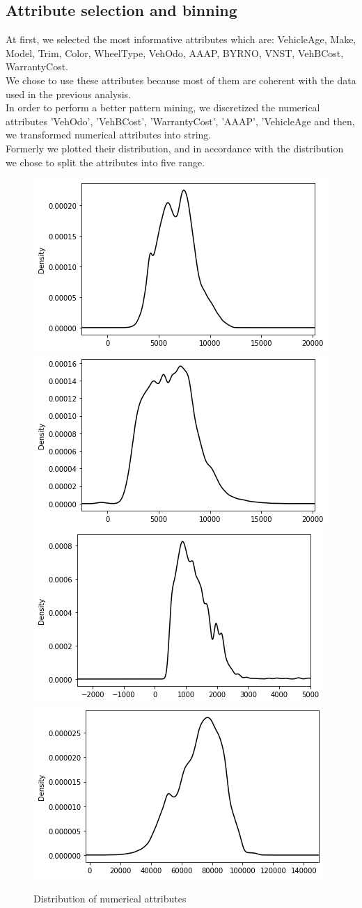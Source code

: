 \documentclass{article}
\begin{document}
	\subsection{Attribute selection and binning}
	
	At first, we selected the most informative attributes which are: VehicleAge, Make, Model, Trim, Color, WheelType, VehOdo, AAAP, BYRNO, VNST, VehBCost, WarrantyCost.
	\\ We chose to use these attributes because most of them are coherent with the data used in the previous analysis.\\  
	In order to perform a better pattern mining, we discretized the numerical attributes 'VehOdo', 'VehBCost', 'WarrantyCost', 'AAAP', 'VehicleAge and then, we transformed numerical attributes into string.\\
	Formerly we plotted their distribution, and in accordance with the distribution we chose to split the attributes into five range.\\  
	
	\begin{figure}[H]
		\centering
		\includegraphics[width=.49\textwidth]{bin1.png}
		\includegraphics[width=.49\textwidth]{bin2.png}
		\includegraphics[width=.49\textwidth]{bin3.png}
		\includegraphics[width=.49\textwidth]{bin4.png}
		\caption{Distribution of numerical attributes}
		\label{fig:hyper_rf}
	\end{figure}
	
\end{document}
